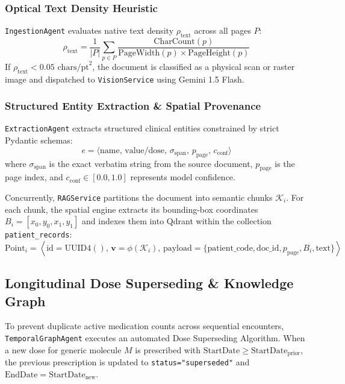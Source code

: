 \documentclass[journal]{IEEEtran}
\begin{document}
\subsubsection{Optical Text Density Heuristic}
\texttt{IngestionAgent} evaluates native text density $\rho_{\text{text}}$ across all pages $P$:
\begin{equation}
\rho_{\text{text}} = \frac{1}{|P|} \sum_{p \in P} \frac{\text{CharCount}(p)}{\text{PageWidth}(p) \times \text{PageHeight}(p)}
\end{equation}
If $\rho_{\text{text}} < 0.05 \text{ chars/pt}^2$, the document is classified as a physical scan or raster image and dispatched to \texttt{VisionService} using Gemini 1.5 Flash.

\subsubsection{Structured Entity Extraction \& Spatial Provenance}
\texttt{ExtractionAgent} extracts structured clinical entities constrained by strict Pydantic schemas:
\begin{equation}
e = \langle \text{name}, \, \text{value/dose}, \, \sigma_{\text{span}}, \, p_{\text{page}}, \, c_{\text{conf}} \rangle
\end{equation}
where $\sigma_{\text{span}}$ is the exact verbatim string from the source document, $p_{\text{page}}$ is the page index, and $c_{\text{conf}} \in [0.0, 1.0]$ represents model confidence.

Concurrently, \texttt{RAGService} partitions the document into semantic chunks $\mathcal{K}_i$. For each chunk, the spatial engine extracts its bounding-box coordinates $B_i = [x_0, y_0, x_1, y_1]$ and indexes them into Qdrant within the collection \texttt{patient\_records}:
\begin{equation}
\text{Point}_i = \left\langle \text{id} = \text{UUID4}(), \, \mathbf{v} = \phi(\mathcal{K}_i), \, \text{payload} = \{ \text{patient\_code}, \text{doc\_id}, p_{\text{page}}, B_i, \text{text} \} \right\rangle
\end{equation}

\subsection{Longitudinal Dose Superseding \& Knowledge Graph}
To prevent duplicate active medication counts across sequential encounters, \texttt{TemporalGraphAgent} executes an automated Dose Superseding Algorithm. When a new dose for generic molecule $M$ is prescribed with $\text{StartDate} \ge \text{StartDate}_{\text{prior}}$, the previous prescription is updated to \texttt{status="superseded"} and $\text{EndDate} = \text{StartDate}_{\text{new}}$.
\end{document}
